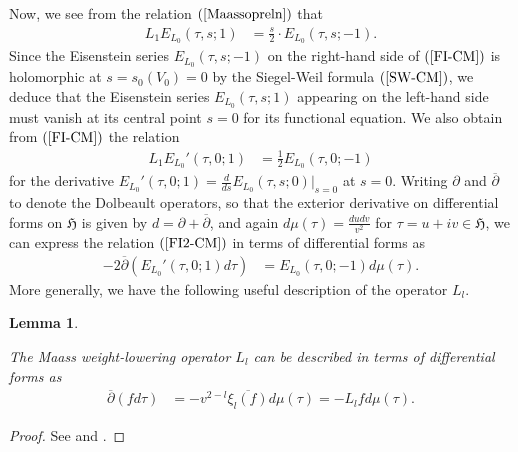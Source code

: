 \documentclass{amsart}
\newtheorem{lemma}[theorem]{Lemma}
\theoremstyle{definition}
\theoremstyle{definition}
\theoremstyle{definition}
\begin{document}
Now, we see from the relation $(\ref{Maassopreln})$ that 
\begin{align}\label{FI-CM} L_1 E_{L_0}(\tau, s; 1) &= \frac{s}{2} \cdot E_{L_0}(\tau, s; -1). \end{align}
Since the Eisenstein series $E_{L_0}(\tau, s; -1)$ on the right-hand side of $(\ref{FI-CM})$ is holomorphic
at $s = s_0(V_0) = 0$ by the Siegel-Weil formula $(\ref{SW-CM})$, we deduce that the Eisenstein series
$E_{L_0}(\tau, s; 1)$ appearing on the left-hand side must vanish at its central point $s=0$ for its functional equation.
We also obtain from $(\ref{FI-CM})$ the relation 
\begin{align}\label{FI2-CM} L_1 E_{L_0}'(\tau, 0; 1) &= \frac{1}{2} E_{L_0}(\tau, 0; -1)\end{align}
for the derivative $E_{L_0}'(\tau, 0; 1) = \frac{d}{ds} E_{L_0}(\tau, s; 0) \big\vert_{s=0}$ at $s=0$.
Writing $\partial$ and $\overline{\partial}$ to denote the Dolbeault operators, so that the exterior
derivative on differential forms on $\mathfrak{H}$ is given by $d = \partial + \overline{\partial}$,
and again $d \mu(\tau) = \frac{du dv}{v^2}$ for $\tau= u+i v \in \mathfrak{H}$, we can express the relation $(\ref{FI2-CM})$ in terms of differential forms as 
\begin{align}\label{FI-CM3} - 2 \overline{\partial} \left(  E_{L_0}'(\tau, 0; 1) d \tau \right) &= E_{L_0}(\tau, 0; -1) d \mu(\tau). \end{align}
More generally, we have the following useful description of the operator $L_l$.

\begin{lemma}\label{diff} 

The Maass weight-lowering operator $L_l$ can be described in terms of differential forms as
\begin{align*} \overline{\partial}(f d \tau) &= - v^{2-l} \overline{\xi_l(f)} d \mu(\tau) = - L_l f d \mu(\tau).\end{align*} \end{lemma}

\begin{proof} See \cite[Lemma 2.5]{Eh} and \cite[Lemma 2.3]{BY}. \end{proof}
\end{document}
